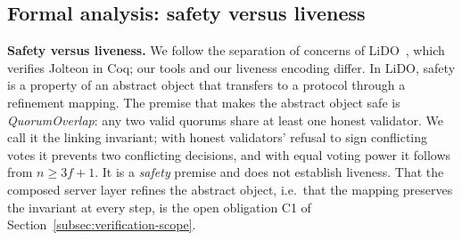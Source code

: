 \subsection*{Formal analysis: safety versus liveness}

\textbf{Safety versus liveness.} We follow the separation of concerns of
LiDO~\cite{qiu2024lido}, which verifies Jolteon in Coq; our tools and our
liveness encoding differ. In LiDO, safety is a property of an abstract object
that transfers to a protocol through a refinement mapping. The premise that makes
the abstract object safe is \emph{QuorumOverlap}: any two valid quorums share at
least one honest validator. We call it the linking invariant; with honest
validators' refusal to sign conflicting votes it prevents two conflicting
decisions, and with equal voting power it follows from $n \ge 3f{+}1$. It is a
\emph{safety} premise and does not establish liveness. That the composed server
layer refines the abstract object, i.e.\ that the mapping preserves the invariant
at every step, is the open obligation C1 of Section~\ref{subsec:verification-scope}.


